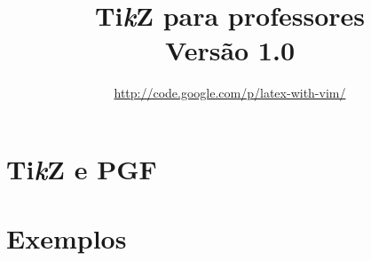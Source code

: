 \documentclass[12pt,a4paper,openright,twoside]{book}
\begin{document}
\title{Ti\emph{k}Z para professores \\ \vspace*{4pt} \small{Versão 1.0}}
\author{\url{http://code.google.com/p/latex-with-vim/}}
\maketitle

\frontmatter 



 

\tableofcontents 
\listoftables

\mainmatter 

\part{Ti\emph{k}Z e PGF}






\part{Exemplos}



\backmatter 




\printindex
\end{document}
